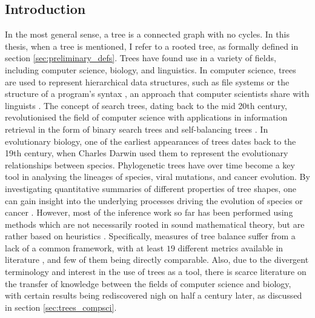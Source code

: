 \subsection{Introduction}
In the most general sense, a tree is a connected graph with no cycles. In this thesis, when a tree is
mentioned, I refer to a rooted tree, as formally defined in section \ref{sec:preliminary_defs}.
Trees have found use in a variety of fields, including computer science, biology, and linguistics.
In computer science, trees are used to represent hierarchical data structures, such as file systems \cite{nievergelt_binary_1974}
or the structure of a program's syntax \cite{knuth_semantics_1968}, an approach that computer scientists
share with linguists \cite{chomsky_syntactic_1957}. The concept of search trees, dating back to the mid 20th century,
revolutionised the field of computer science with applications in information retrieval in the form of
binary search trees and self-balancing trees \cite{nievergelt_binary_1972, knuth_art_1997}. In evolutionary biology,
one of the earliest appearances of trees dates back to the 19th century, when Charles Darwin used them to represent the evolutionary
relationships between species. Phylogenetic trees have over time become a key tool in analysing the
lineages of species, viral mutations, and cancer evolution. By investigating quantitative summaries of different properties
of tree shapes, one can gain insight into the underlying processes driving the evolution of species \cite{mooers_inferring_1997}
or cancer \cite{scott_inferring_2018, noble_spatial_2022}. However, most of the inference work so far has been performed
using methods which are not necessarily rooted in sound mathematical theory, but are rather based on heuristics \cite{omeara_evolutionary_2012}.
Specifically, measures of tree balance suffer from a lack of a common framework, with at least $19$ different metrics available
in literature \cite{fischer_tree_2021}, and few of them being directly comparable. Also, due to the divergent terminology and
interest in the use of trees as a tool, there is scarce literature on the transfer of knowledge between the fields of computer science
and biology, with certain results being rediscovered nigh on half a century later, as discussed in section \ref{sec:trees_compsci}.

